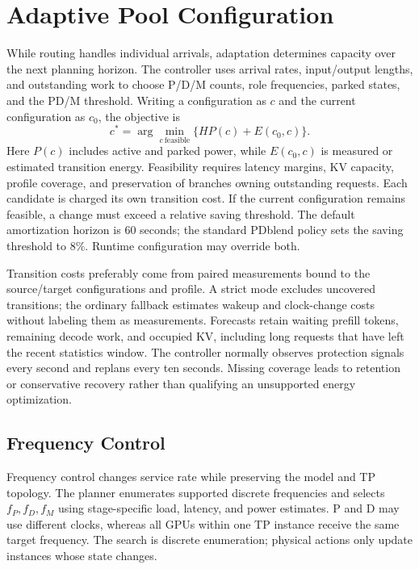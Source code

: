 \documentclass[11pt,a4paper,twocolumn]{article}
\begin{document}
\section{Adaptive Pool Configuration}
\label{sec:adaptive}

While routing handles individual arrivals, adaptation
determines capacity over the next planning horizon.
The controller uses arrival rates, input/output lengths,
and outstanding work to choose P/D/M counts, role
frequencies, parked states, and the PD/M threshold.
Writing a configuration as $c$ and the current configuration
as $c_0$, the objective is
\begin{equation}
c^*=\arg\min_{c\ \mathrm{feasible}}
       \{H P(c)+E(c_0,c)\}.
\label{eq:pool-objective}
\end{equation}
Here $P(c)$ includes active and parked power, while
$E(c_0,c)$ is measured or estimated transition energy.
Feasibility requires latency margins, KV capacity, profile
coverage, and preservation of branches owning outstanding
requests. Each candidate is charged its own transition
cost. If the current configuration remains feasible,
a change must exceed a relative saving threshold.
The default amortization horizon is 60 seconds; the standard
PDblend policy sets the saving threshold to 8\%.
Runtime configuration may override both.

Transition costs preferably come from paired measurements
bound to the source/target configurations and profile.
A strict mode excludes uncovered transitions; the ordinary
fallback estimates wakeup and clock-change costs without
labeling them as measurements. Forecasts retain waiting
prefill tokens, remaining decode work, and occupied KV,
including long requests that have left the recent statistics
window. The controller normally observes protection signals
every second and replans every ten seconds. Missing coverage
leads to retention or conservative recovery rather than
qualifying an unsupported energy optimization.

\subsection{Frequency Control}

Frequency control changes service rate while preserving the
model and TP topology. The planner enumerates supported
discrete frequencies and selects $f_P,f_D,f_M$ using
stage-specific load, latency, and power estimates.
P and D may use different clocks, whereas all GPUs within
one TP instance receive the same target frequency.
The search is discrete enumeration; physical actions only
update instances whose state changes.
\end{document}
